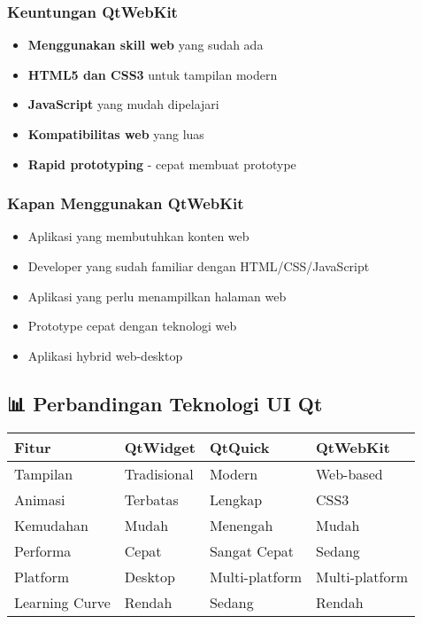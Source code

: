 \subsubsection{Keuntungan QtWebKit}

\begin{itemize}
\item \textbf{Menggunakan skill web} yang sudah ada
\item \textbf{HTML5 dan CSS3} untuk tampilan modern
\item \textbf{JavaScript} yang mudah dipelajari
\item \textbf{Kompatibilitas web} yang luas
\item \textbf{Rapid prototyping} - cepat membuat prototype
\end{itemize}

\subsubsection{Kapan Menggunakan QtWebKit}

\begin{itemize}
\item Aplikasi yang membutuhkan konten web
\item Developer yang sudah familiar dengan HTML/CSS/JavaScript
\item Aplikasi yang perlu menampilkan halaman web
\item Prototype cepat dengan teknologi web
\item Aplikasi hybrid web-desktop
\end{itemize}

\subsection{📊 Perbandingan Teknologi UI Qt}

\begin{center}
\begin{tabular}{|l|l|l|l|}
\hline
\textbf{Fitur} & \textbf{QtWidget} & \textbf{QtQuick} & \textbf{QtWebKit} \\
\hline
Tampilan & Tradisional & Modern & Web-based \\
\hline
Animasi & Terbatas & Lengkap & CSS3 \\
\hline
Kemudahan & Mudah & Menengah & Mudah \\
\hline
Performa & Cepat & Sangat Cepat & Sedang \\
\hline
Platform & Desktop & Multi-platform & Multi-platform \\
\hline
Learning Curve & Rendah & Sedang & Rendah \\
\hline
\end{tabular}
\end{center}


